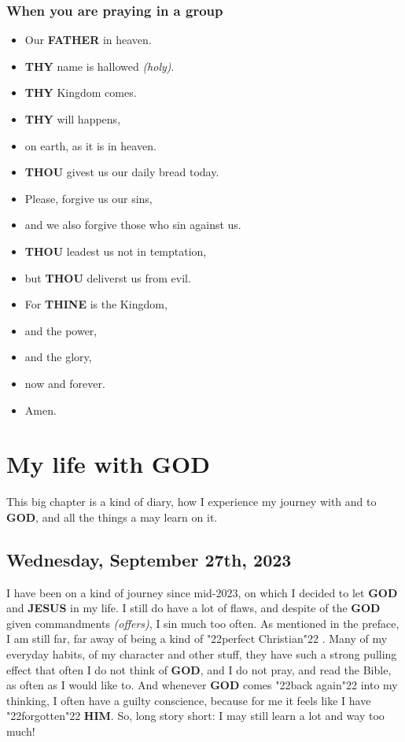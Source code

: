 \documentclass[12pt,a4paper]{article}
\newcommand{\God}[0]{\textbf{GOD}}
\newcommand{\Father}[0]{\textbf{FATHER}}
\newcommand{\Him}[0]{\textbf{HIM}}
\newcommand{\Jesus}[0]{\textbf{JESUS}}
\newcommand{\Thine}[0]{\textbf{THINE}}
\newcommand{\Thou}[0]{\textbf{THOU}}
\newcommand{\Thy}[0]{\textbf{THY}}
\newcommand{\q}[1]{\char"22{#1}\char"22 }
\begin{document}
		\subsubsection{When you are praying in a group}
			\begin{itemize}[nosep]
				\item[]	Our {\Father} in heaven.
				\item[]	{\Thy} name is hallowed \textit{(holy)}.
				\item[]	{\Thy} Kingdom comes.
				\item[]	{{\Thy} will happens},
				\item[]	on earth,
						as it is in heaven.
				\item[]	{\Thou} givest us our daily bread today.
				\item[]	Please,
						forgive us our sins,
				\item[]	and we also forgive those who sin against us.
				\item[]	{\Thou} leadest us not in temptation,
				\item[]	but {\Thou} deliverst us from evil.
				\item[]	For {\Thine} is the Kingdom,
				\item[]	and the power,
				\item[]	and the glory,
				\item[]	now and forever.
				\item[]	Amen.
			\end{itemize}

	\newpage
	\section{My life with {\God}} \label{MeinLebenMitGott}
		This big chapter is a kind of diary,
		how I experience my journey with and to {\God},
		and all the things a may learn on it.
	
	\subsection{Wednesday, September 27th, 2023}
		I have been on a kind of journey since mid-2023,
		on which I decided to let {\God} and {\Jesus} in my life.
		I still do have a lot of flaws,
		and despite of the {\God} given commandments \textit{(offers)},
		I sin much too often.
		As mentioned in the preface,
		I am still far,
		far away of being a kind of \q{perfect Christian}.
		Many of my everyday habits,
		of my character and other stuff,
		they have such a strong pulling effect
		that often I do not think of {\God},
		and I do not pray,
		and read the Bible,
		as often as I would like to.
		And whenever {\God} comes \q{back again} into my thinking,
		I often have a guilty conscience,
		because for me it feels like I have \q{forgotten} {\Him}.
		So,
		long story short:
		I may still learn a lot and way too much!
\end{document}
